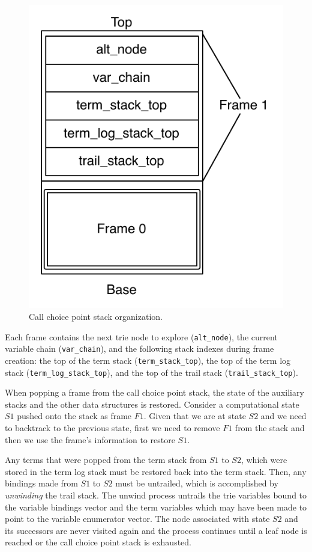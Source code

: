 \begin{figure}[ht]
  \centering
    \includegraphics[scale=0.6]{call_choice_point_stack.pdf}
  \caption{Call choice point stack organization.}
  \label{fig:call_choice_point_stack}
\end{figure}

Each frame contains the next trie node to explore (\texttt{alt\_node}),
the current variable chain (\texttt{var\_chain}),
and the following stack indexes during frame creation:
the top of the term stack (\texttt{term\_stack\_top}),
the top of the term log stack (\texttt{term\_log\_stack\_top}),
and the top of the trail stack (\texttt{trail\_stack\_top}).

When popping a frame from the call choice point stack, the state of the auxiliary stacks and the other data
structures is restored. Consider a computational state $S1$ pushed onto the stack
as frame $F1$. Given that we are at state $S2$ and we need to backtrack to the previous state,
first we need to remove $F1$ from the stack and then we use the frame's information to restore $S1$.

Any terms that were popped from the term stack from $S1$ to $S2$, which were
stored in the term log stack must be restored back into the term stack.
Then, any bindings made from $S1$ to $S2$ must be untrailed, which is
accomplished by \textit{unwinding} the trail stack. The unwind process untrails
the trie variables bound to the variable bindings vector
and the term variables which may have been made to point to the variable enumerator
vector. The node associated with state $S2$ and its successors are never visited again and
the process continues until a leaf node is reached or the call choice point stack
is exhausted.

